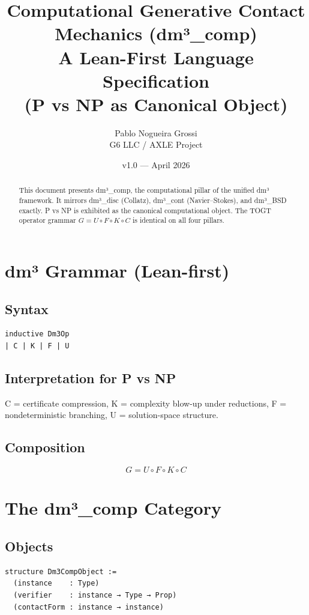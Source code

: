 \documentclass[11pt,a4paper]{article}
\title{\textbf{Computational Generative Contact Mechanics (dm³\_comp)}\\
A Lean-First Language Specification \\
(P vs NP as Canonical Object)}
\author{Pablo Nogueira Grossi \\ G6 LLC / AXLE Project}
\date{v1.0 — April 2026}
\begin{document}
\maketitle

\begin{abstract}
This document presents dm³\_comp, the computational pillar of the unified dm³ framework. It mirrors dm³\_disc (Collatz), dm³\_cont (Navier–Stokes), and dm³\_BSD exactly. P vs NP is exhibited as the canonical computational object. The TOGT operator grammar \(G = U \circ F \circ K \circ C\) is identical on all four pillars.
\end{abstract}

\section{dm³ Grammar (Lean-first)}

\subsection{Syntax}
\begin{lstlisting}
inductive Dm3Op
| C | K | F | U
\end{lstlisting}

\subsection{Interpretation for P vs NP}
C = certificate compression,  
K = complexity blow-up under reductions,  
F = nondeterministic branching,  
U = solution-space structure.

\subsection{Composition}
\[
G = U \circ F \circ K \circ C
\]

\section{The dm³\_comp Category}

\subsection{Objects}
\begin{lstlisting}
structure Dm3CompObject :=
  (instance    : Type)
  (verifier    : instance → Type → Prop)
  (contactForm : instance → instance)
\end{lstlisting}
\end{document}
